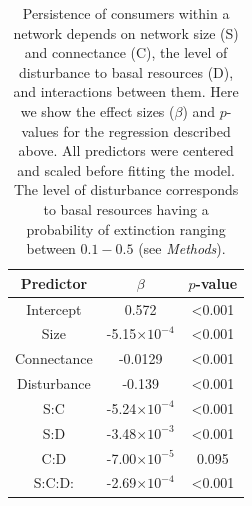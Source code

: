 \documentclass[12pt]{article}
\begin{document}
\begin{spacing}{2.0}
    
        \begin{table}[hb!]
            \caption{Persistence of consumers within a network depends on network size (S) and connectance (C), the level of disturbance to basal resources (D), and interactions between them. Here we show the effect sizes ($\beta$) and $p$-values for the regression described above. All predictors were centered and scaled before fitting the model. The level of disturbance corresponds to basal resources having a probability of extinction ranging between $0.1 - 0.5$ (see \emph{Methods}).
            }
            \label{tab:per_vs_SC}
            \centering
            \begin{tabular}{c|c c |}
                Predictor & $\beta$ & $p$-value \\
                \hline
                Intercept & 0.572 & \textless0.001 \\
                Size & -5.15$\times10^{-4}$  & \textless0.001 \\
                Connectance & -0.0129 & \textless0.001 \\
                Disturbance & -0.139 & \textless0.001 \\
                S:C & -5.24$\times10^{-4}$ & \textless0.001 \\
                S:D & -3.48$\times10^{-3}$ & \textless0.001 \\
                C:D & -7.00$\times10^{-5}$ & 0.095 \\
                S:C:D: & -2.69$\times10^{-4}$ & \textless0.001 \\
            \end{tabular}
        \end{table}
        
    \clearpage


\end{spacing}
\end{document}
